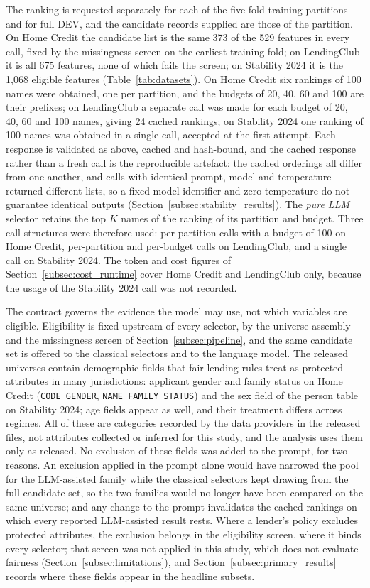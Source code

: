 \documentclass[final,5p,twocolumn]{elsarticle}
\newcommand{\Kfeat}{K}
\begin{document}
The ranking is requested separately for each of the five fold training partitions and for full DEV, and the candidate records supplied are those of the partition. On Home Credit the candidate list is the same 373 of the 529 features in every call, fixed by the missingness screen on the earliest training fold; on LendingClub it is all 675 features, none of which fails the screen; on Stability 2024 it is the 1,068 eligible features (Table~\ref{tab:datasets}). On Home Credit six rankings of 100 names were obtained, one per partition, and the budgets of 20, 40, 60 and 100 are their prefixes; on LendingClub a separate call was made for each budget of 20, 40, 60 and 100 names, giving 24 cached rankings; on Stability 2024 one ranking of 100 names was obtained in a single call, accepted at the first attempt. Each response is validated as above, cached and hash-bound, and the cached response rather than a fresh call is the reproducible artefact: the cached orderings all differ from one another, and calls with identical prompt, model and temperature returned different lists, so a fixed model identifier and zero temperature do not guarantee identical outputs (Section~\ref{subsec:stability_results}). The \emph{pure LLM} selector retains the top $\Kfeat$ names of the ranking of its partition and budget. Three call structures were therefore used: per-partition calls with a budget of 100 on Home Credit, per-partition and per-budget calls on LendingClub, and a single call on Stability 2024. The token and cost figures of Section~\ref{subsec:cost_runtime} cover Home Credit and LendingClub only, because the usage of the Stability 2024 call was not recorded.

The contract governs the evidence the model may use, not which variables are eligible. Eligibility is fixed upstream of every selector, by the universe assembly and the missingness screen of Section~\ref{subsec:pipeline}, and the same candidate set is offered to the classical selectors and to the language model. The released universes contain demographic fields that fair-lending rules treat as protected attributes in many jurisdictions: applicant gender and family status on Home Credit (\texttt{CODE\_GENDER}, \texttt{NAME\_FAMILY\_STATUS}) and the sex field of the person table on Stability 2024; age fields appear as well, and their treatment differs across regimes. All of these are categories recorded by the data providers in the released files, not attributes collected or inferred for this study, and the analysis uses them only as released. No exclusion of these fields was added to the prompt, for two reasons. An exclusion applied in the prompt alone would have narrowed the pool for the LLM-assisted family while the classical selectors kept drawing from the full candidate set, so the two families would no longer have been compared on the same universe; and any change to the prompt invalidates the cached rankings on which every reported LLM-assisted result rests. Where a lender's policy excludes protected attributes, the exclusion belongs in the eligibility screen, where it binds every selector; that screen was not applied in this study, which does not evaluate fairness (Section~\ref{subsec:limitations}), and Section~\ref{subsec:primary_results} records where these fields appear in the headline subsets.
\end{document}
